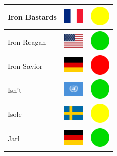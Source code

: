 \documentclass[12pt, a4paper, twoside]{report}
\begin{document}
\begin{center}
\begin{longtable}{|p{5cm}|p{2cm}|p{2cm}|}
Iron Bastards & \includegraphics[width=1cm]{4x3/fr} & \includegraphics[width=1cm]{likes/m} \\ \hline
Iron Reagan & \includegraphics[width=1cm]{4x3/us} & \includegraphics[width=1cm]{likes/y} \\ \hline
Iron Savior & \includegraphics[width=1cm]{4x3/de} & \includegraphics[width=1cm]{likes/n} \\ \hline
Isn't & \includegraphics[width=1cm]{4x3/un} & \includegraphics[width=1cm]{likes/y} \\ \hline
Isole & \includegraphics[width=1cm]{4x3/se} & \includegraphics[width=1cm]{likes/m} \\ \hline
Jarl & \includegraphics[width=1cm]{4x3/de} & \includegraphics[width=1cm]{likes/y} \\ \hline

\end{longtable}
\end{center}
\end{document}
